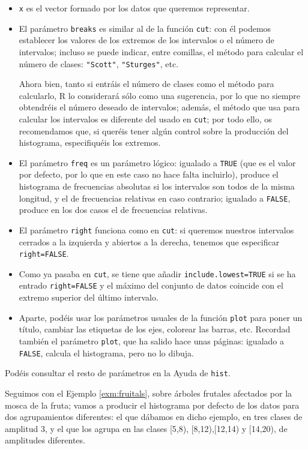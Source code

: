 \documentclass[]{book}
\theoremstyle{definition}
\theoremstyle{definition}
\theoremstyle{definition}
\theoremstyle{remark}
\let\BeginKnitrBlock\begin \let\EndKnitrBlock\end
\begin{document}
\begin{itemize}
\item
  \texttt{x} es el vector formado por los datos que queremos representar.
\item
  El parámetro \texttt{breaks} es similar al de la función \texttt{cut}: con él podemos establecer los valores de los extremos de los intervalos o el número de intervalos; incluso se puede indicar, entre comillas, el método para calcular el número de clases: \texttt{"Scott"}, \texttt{"Sturges"}, etc.

  Ahora bien, tanto si entráis el número de clases como el método para calcularlo, R lo considerará sólo como una sugerencia, por lo que no siempre obtendréis el número deseado de intervalos; además, el método que usa para calcular los intervalos es diferente del usado en \texttt{cut}; por todo ello, os recomendamos que, si queréis tener algún control sobre la producción del histograma, especifiquéis los extremos.
\item
  El parámetro \texttt{freq} es un parámetro lógico: igualado a \texttt{TRUE} (que es el valor por defecto, por lo que en este caso no hace falta incluirlo), produce el histograma de frecuencias absolutas si los intervalos son todos de la misma longitud, y el de frecuencias relativas en caso contrario; igualado a \texttt{FALSE}, produce en los dos casos el de frecuencias relativas.
\item
  El parámetro \texttt{right} funciona como en \texttt{cut}: si queremos nuestros intervalos cerrados a la izquierda y abiertos a la derecha, tenemos que especificar \texttt{right=FALSE}.
\item
  Como ya pasaba en \texttt{cut}, se tiene que añadir \texttt{include.lowest=TRUE} si se ha entrado \texttt{right=FALSE} y el máximo del conjunto de datos coincide con el extremo superior del último intervalo.
\item
  Aparte, podéis usar los parámetros usuales de la función \texttt{plot} para poner un título, cambiar las etiquetas de los ejes, colorear las barras, etc. Recordad también el parámetro \texttt{plot}, que ha salido hace unas páginas: igualado a \texttt{FALSE}, calcula el histograma, pero no lo dibuja.
\end{itemize}

Podéis consultar el resto de parámetros en la Ayuda de \texttt{hist}.

\BeginKnitrBlock{example}
\protect\hypertarget{exm:frut-hist}{}{\label{exm:frut-hist} }Seguimos con el Ejemplo \ref{exm:fruitals}, sobre árboles frutales afectados por la mosca de la fruta;
vamos a producir el histograma por defecto de los datos para dos agrupamientos diferentes: el que dábamos en dicho ejemplo, en tres clases de amplitud 3, y el que los agrupa en las clases
{[}5,8), {[}8,12),{[}12,14) y {[}14,20),
de amplitudes diferentes.
\EndKnitrBlock{example}
\end{document}
